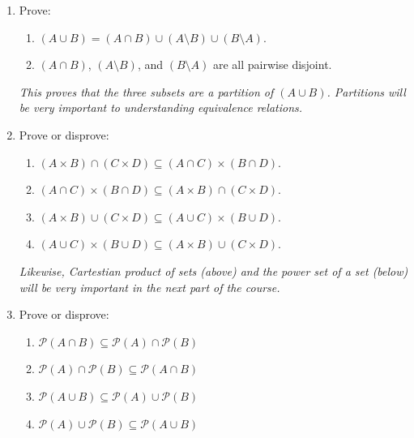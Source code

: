 \documentclass[11pt]{article}
\begin{document}
\begin{enumerate}

\item Prove:
\begin{enumerate}
\item $(A \cup B) = (A \cap B) \cup (A \setminus B) \cup (B \setminus A)$.  
\item $(A \cap B)$, $(A \setminus B)$, and $(B \setminus A)$ are all 
pairwise disjoint.
\end{enumerate}
\emph{This proves that the three subsets are a \emph{partition} of 
$(A \cup B)$.  
Partitions will be very important to understanding equivalence relations.}

\item Prove or disprove:
\begin{enumerate}
\item $(A \times B) \cap (C \times D) \subseteq (A \cap C) \times (B \cap D)$.
\item $(A \cap C) \times (B \cap D) \subseteq (A \times B) \cap (C \times D)$.
\item $(A \times B) \cup (C \times D) \subseteq (A \cup C) \times (B \cup D)$.
\item $(A \cup C) \times (B \cup D) \subseteq (A \times B) \cup (C \times D)$.
\end{enumerate}
\emph{Likewise, Cartestian product of sets (above) and the power set of a 
set (below) will be very important in the next part of the course.}

\item Prove or disprove:
\begin{enumerate}
\item
\( {\mathcal P}(A\cap B)\subseteq {\mathcal P}(A) \cap {\mathcal P}(B) \)
\item
\( {\mathcal P}(A) \cap {\mathcal P}(B)\subseteq {\mathcal P}(A\cap B) \)
\item
\( {\mathcal P}(A\cup B)\subseteq {\mathcal P}(A) \cup {\mathcal P}(B) \)
\item
\( {\mathcal P}(A) \cup {\mathcal P}(B)\subseteq {\mathcal P}(A\cup B) \)
\end{enumerate}

\end{enumerate}
\end{document}
